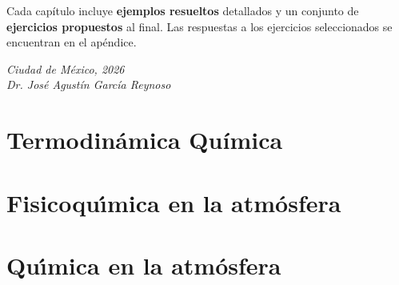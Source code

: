 \documentclass[
    11pt,                %
    twoside,             %
    openright,           %
    spanish,             %
]{book}
\begin{document}
\medskip
\noindent
Cada cap\'itulo incluye \textbf{ejemplos resueltos} detallados y un conjunto de
\textbf{ejercicios propuestos} al final. Las respuestas a los ejercicios seleccionados
se encuentran en el ap\'endice.

\medskip
\noindent
\textit{Ciudad de M\'exico, 2026}\\[0.5em]
\textit{Dr. José Agustín García Reynoso}

\tableofcontents

\listoffigures

\listoftables

\mainmatter                          %
\pagestyle{fancy}

\part{Termodin\'amica Qu\'imica}









\part{Fisicoqu\'{\i}mica en la atm\'osfera}
 




 

\part{Qu\'{\i}mica en la atm\'osfera}
\end{document}

